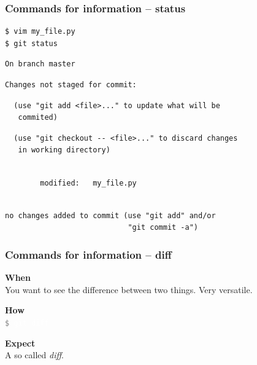 \documentclass{beamer}
\newcommand{\keyword}[1]{\hspace{-1.0em}\textcolor{lkblue}{\textbf{#1}}\vspace{0.2em}} %
\newcommand{\command}[1]{\colorbox{black!78}{\vphantom{Ep}\texttt{\textcolor{gray}{\$}
\textcolor{white}{#1}}}}
\begin{document}
\begin{frame}[fragile]
  \frametitle{Commands for information -- status}

\begin{verbatim}
$ vim my_file.py
$ git status
\end{verbatim}
\pause{}
\vspace{-3.5ex}
\begin{verbatim}
On branch master
\end{verbatim}
\pause{}
\vspace{-3.5ex}
\begin{verbatim}
Changes not staged for commit:
\end{verbatim}
\pause{}
\vspace{-3.5ex}
\begin{verbatim}
  (use "git add <file>..." to update what will be
   commited)
\end{verbatim}
\pause{}
\vspace{-3.5ex}
\begin{verbatim}
  (use "git checkout -- <file>..." to discard changes
   in working directory)
\end{verbatim}
\pause{}
\vspace{-3.5ex}
\begin{verbatim}

        modified:   my_file.py
\end{verbatim}
\pause{}
\vspace{-3.5ex}
\begin{verbatim}

no changes added to commit (use "git add" and/or
                            "git commit -a")
\end{verbatim}
\end{frame}

\begin{frame}
  \frametitle{Commands for information -- diff}

  \keyword{When}\\
  You want to see the difference between two things. Very versatile.
  \vspace{0.5em}

  \keyword{How}\\
  \command{git diff}
  \vspace{0.5em}

  \keyword{Expect}\\
  A so called \emph{diff}.
\end{frame}
\end{document}

